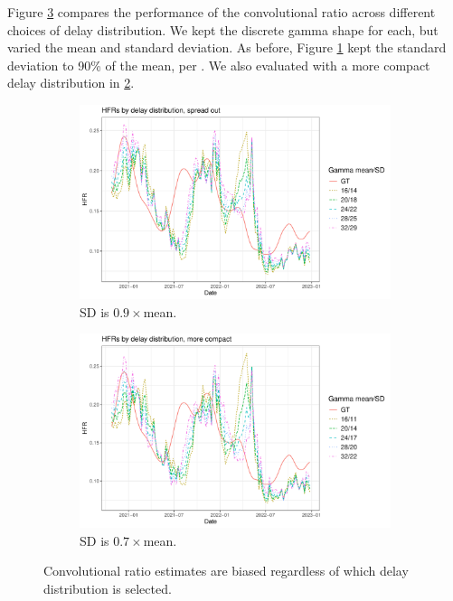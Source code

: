 \documentclass{article}
\begin{document}
Figure \ref{fig:delays} compares the performance of the convolutional ratio across different choices of delay distribution. We kept the discrete gamma shape for each, but varied the mean and standard deviation. As before, Figure \ref{fig:delay1} kept the standard deviation to 90\% of the mean, per \citet{UKdelay}. We also evaluated with a more compact delay distribution in \ref{fig:delay2}. 


\begin{figure}
     \centering
     \begin{subfigure}[b]{0.45\linewidth}
         \centering
         \includegraphics[width=\linewidth]{Figures/Real/hfrs_by_delay1.pdf}
         \caption{SD is $0.9\times$mean.}
         \label{fig:delay1}
     \end{subfigure}
     \hfill
     \begin{subfigure}[b]{0.45\linewidth}
         \centering
         \includegraphics[width=\linewidth]{Figures/Real/hfrs_by_delay2.pdf}
         \caption{SD is $0.7\times$mean.}
         \label{fig:delay2}
     \end{subfigure}
        \caption{Convolutional ratio estimates are biased regardless of which delay distribution is selected.}
        \label{fig:delays}
\end{figure}
\end{document}
